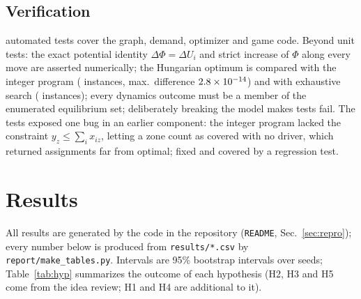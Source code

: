\documentclass[11pt]{article}
\begin{document}
\subsection{Verification}\label{sec:verify}
\nTests{} automated tests cover the graph, demand, optimizer and game code. Beyond unit tests: the exact potential identity $\Delta\Phi=\Delta U_i$ and strict increase of $\Phi$ along every move are asserted numerically; the Hungarian optimum is compared with the integer program (\hungN{} instances, max.\ difference $2.8\times10^{-14}{}$) and with exhaustive search (\nV{} instances); every dynamics outcome must be a member of the enumerated equilibrium set; deliberately breaking the model makes \mutFail{} tests fail. The tests exposed one bug in an earlier component: the integer program lacked the constraint $y_z\le\sum_ix_{iz}$, letting a zone count as covered with no driver, which returned assignments far from optimal; fixed and covered by a regression test.

\section{Results}\label{sec:results}
All results are generated by the code in the repository (\texttt{README}, Sec.~\ref{sec:repro}); every number below is produced from \texttt{results/*.csv} by \texttt{report/make\_tables.py}. Intervals are 95\% bootstrap intervals over seeds; Table~\ref{tab:hyp} summarizes the outcome of each hypothesis (H2, H3 and H5 come from the idea review; H1 and H4 are additional to it).\\
\end{document}
